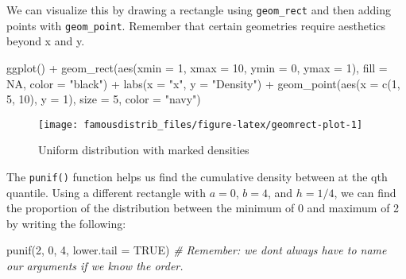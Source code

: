 \documentclass[
]{article}
\newenvironment{Shaded}{\begin{snugshade}}{\end{snugshade}}
\newcommand{\AttributeTok}[1]{\textcolor[rgb]{0.77,0.63,0.00}{#1}}
\newcommand{\CommentTok}[1]{\textcolor[rgb]{0.56,0.35,0.01}{\textit{#1}}}
\newcommand{\ConstantTok}[1]{\textcolor[rgb]{0.00,0.00,0.00}{#1}}
\newcommand{\DecValTok}[1]{\textcolor[rgb]{0.00,0.00,0.81}{#1}}
\newcommand{\FunctionTok}[1]{\textcolor[rgb]{0.00,0.00,0.00}{#1}}
\newcommand{\NormalTok}[1]{#1}
\newcommand{\SpecialCharTok}[1]{\textcolor[rgb]{0.00,0.00,0.00}{#1}}
\newcommand{\StringTok}[1]{\textcolor[rgb]{0.31,0.60,0.02}{#1}}
\begin{document}
We can visualize this by drawing a rectangle using \texttt{geom\_rect} and then adding points with \texttt{geom\_point}. Remember that certain geometries require aesthetics beyond x and y.

\begin{Shaded}
\begin{Highlighting}[]
\FunctionTok{ggplot}\NormalTok{() }\SpecialCharTok{+}
  \FunctionTok{geom\_rect}\NormalTok{(}\FunctionTok{aes}\NormalTok{(}\AttributeTok{xmin =} \DecValTok{1}\NormalTok{, }\AttributeTok{xmax =} \DecValTok{10}\NormalTok{, }\AttributeTok{ymin =} \DecValTok{0}\NormalTok{, }\AttributeTok{ymax =} \DecValTok{1}\NormalTok{), }\AttributeTok{fill =} \ConstantTok{NA}\NormalTok{, }
            \AttributeTok{color =} \StringTok{"black"}\NormalTok{) }\SpecialCharTok{+}
  \FunctionTok{labs}\NormalTok{(}\AttributeTok{x =} \StringTok{"x"}\NormalTok{, }\AttributeTok{y =} \StringTok{"Density"}\NormalTok{) }\SpecialCharTok{+}
  \FunctionTok{geom\_point}\NormalTok{(}\FunctionTok{aes}\NormalTok{(}\AttributeTok{x =} \FunctionTok{c}\NormalTok{(}\DecValTok{1}\NormalTok{, }\DecValTok{5}\NormalTok{, }\DecValTok{10}\NormalTok{), }\AttributeTok{y =} \DecValTok{1}\NormalTok{), }\AttributeTok{size =} \DecValTok{5}\NormalTok{, }\AttributeTok{color =} \StringTok{"navy"}\NormalTok{)}
\end{Highlighting}
\end{Shaded}

\begin{figure}

{\centering \texttt{[image: famousdistrib\_files/figure-latex/geomrect-plot-1]} 

}

\caption{Uniform distribution with marked densities}\label{fig:geomrect-plot}
\end{figure}

The \texttt{punif()} function helps us find the cumulative density between at the qth quantile. Using a different rectangle with \(a = 0\), \(b = 4\), and \(h = 1/4\), we can find the proportion of the distribution between the minimum of 0 and maximum of 2 by writing the following:

\begin{Shaded}
\begin{Highlighting}[]
\FunctionTok{punif}\NormalTok{(}\DecValTok{2}\NormalTok{, }\DecValTok{0}\NormalTok{, }\DecValTok{4}\NormalTok{, }\AttributeTok{lower.tail =} \ConstantTok{TRUE}\NormalTok{) }\CommentTok{\# Remember: we don\textquotesingle{}t always have to name our arguments if we know the order.}
\end{Highlighting}
\end{Shaded}
\end{document}
